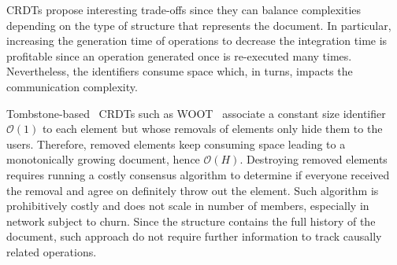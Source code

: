\begin{asparadesc}
  CRDTs propose interesting trade-offs since they can balance complexities
  depending on the type of structure that represents the document.  In
  particular, increasing the generation time of operations to decrease the
  integration time is profitable since an operation generated once is
  re-executed many times. Nevertheless, the identifiers consume space which, in
  turns, impacts the communication complexity.

\item [Tombstone-based~\cite{ahmed2011evaluating, conway2014language,
    grishchenko2010deep, oster2006data, roh2011replicated, weiss2007wooki,
    wu2010partial, yu2012stringwise}] CRDTs such as WOOT~\cite{oster2006data}
  associate a constant size identifier $\mathcal{O}(1)$ to each element but
  whose removals of elements only hide them to the users. Therefore, removed
  elements keep consuming space leading to a monotonically growing document,
  hence $\mathcal{O}(H)$.  Destroying removed elements requires running a costly
  consensus algorithm to determine if everyone received the removal and agree on
  definitely throw out the element. Such algorithm is prohibitively costly and
  does not scale in number of members, especially in network subject to
  churn. Since the structure contains the full history of the document, such
  approach do not require further information to track causally related
  operations.


\end{asparadesc}
